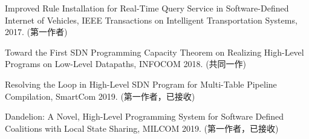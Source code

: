 
\begin{enumerate}[{[}1{]}]
\item Improved Rule Installation for Real-Time Query Service in Software-Defined Internet of Vehicles, IEEE Transactions on Intelligent Transportation Systems, 2017. (第一作者)
\item Toward the First SDN Programming Capacity Theorem on Realizing High-Level Programs on Low-Level Datapaths, INFOCOM 2018. (共同一作)
\item Resolving the Loop in High-Level SDN Program for Multi-Table Pipeline Compilation, SmartCom 2019. (第一作者，已接收)
\item Dandelion: A Novel, High-Level Programming System for Software Defined Coalitions with Local State Sharing, MILCOM 2019. (第一作者，已接收)
\end{enumerate}

